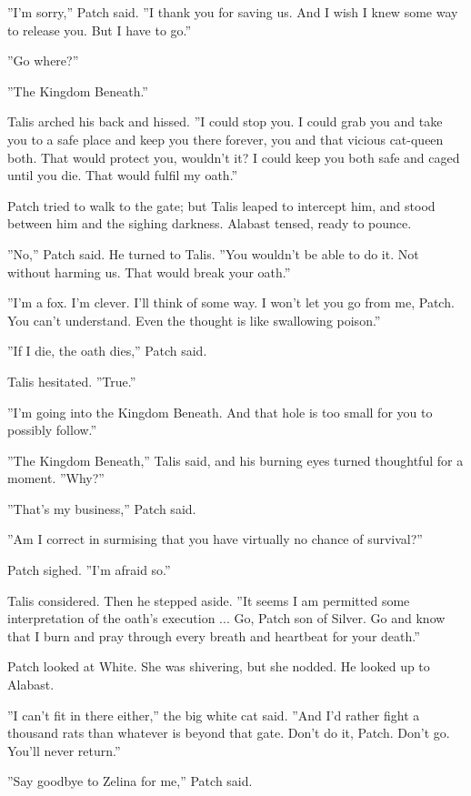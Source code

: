 \documentclass[11pt]{article}
\begin{document}
 ''I'm sorry,'' Patch said. ''I thank you for saving us. And I wish I knew some way to release you. But I have to go.''\par
 ''Go where?''\par
 ''The Kingdom Beneath.''\par
 Talis arched his back and hissed. ''I could stop you. I could grab you and take you to a safe place and keep you there forever, you and that vicious cat-queen both. That would protect you, wouldn't it? I could keep you both safe and caged until you die. That would fulfil my oath.''\par
 Patch tried to walk to the gate; but Talis leaped to intercept him, and stood between him and the sighing darkness. Alabast tensed, ready to pounce.\par
 ''No,'' Patch said. He turned to Talis. ''You wouldn't be able to do it. Not without harming us. That would break your oath.''\par
 ''I'm a fox. I'm clever. I'll think of some way. I won't let you go from me, Patch. You can't understand. Even the thought is like swallowing poison.''\par
 ''If I die, the oath dies,'' Patch said.\par
 Talis hesitated. ''True.''\par
 ''I'm going into the Kingdom Beneath. And that hole is too small for you to possibly follow.''\par
 ''The Kingdom Beneath,'' Talis said, and his burning eyes turned thoughtful for a moment. ''Why?''\par
 ''That's my business,'' Patch said.\par
 ''Am I correct in surmising that you have virtually no chance of survival?''\par
 Patch sighed. ''I'm afraid so.''\par
 Talis considered. Then he stepped aside. ''It seems I am permitted some interpretation of the oath's execution ... Go, Patch son of Silver. Go and know that I burn and pray through every breath and heartbeat for your death.''\par
 Patch looked at White. She was shivering, but she nodded. He looked up to Alabast.\par
 ''I can't fit in there either,'' the big white cat said. ''And I'd rather fight a thousand rats than whatever is beyond that gate. Don't do it, Patch. Don't go. You'll never return.''\par
 ''Say goodbye to Zelina for me,'' Patch said.\par
\end{document}
